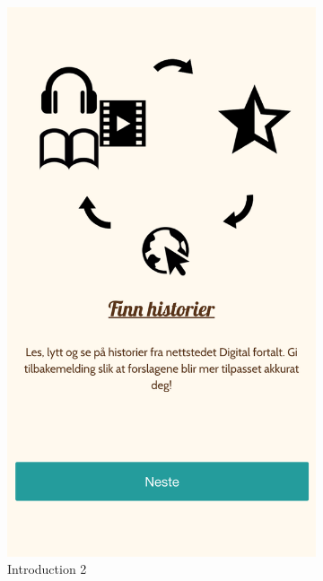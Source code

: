 \begin{appendices}
\begin{figure}[h]
\begin{subfigure}[h]{0.3\textwidth}
			\includegraphics[width=\textwidth]{fig/screenshot_intro2}
			\caption{Introduction 2}
		\end{subfigure}
		\begin{subfigure}[h]{0.3\textwidth}

\end{subfigure}
\end{figure}
\end{appendices}
